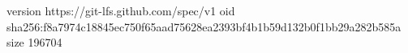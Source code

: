 version https://git-lfs.github.com/spec/v1
oid sha256:f8a7974c18845ec750f65aad75628ea2393bf4b1b59d132b0f1bb29a282b585a
size 196704
